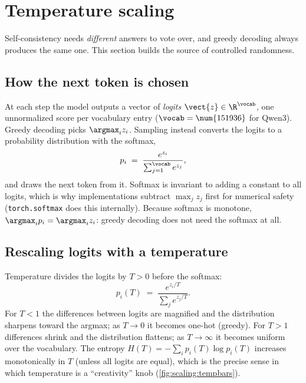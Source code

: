 \section{Temperature scaling}\label{sec:scaling:temp}


Self-consistency needs \emph{different} answers to vote over, and greedy decoding always produces
the same one. This section builds the source of controlled randomness.

\subsection{How the next token is chosen}\label{sec:scaling:select}

At each step the model outputs a vector of \emph{logits} $\vect{z} \in \R^{\vocab}$, one unnormalized
score per vocabulary entry ($\vocab = \num{151936}$ for Qwen3). Greedy decoding picks
$\argmax_i z_i$. Sampling instead converts the logits to a probability distribution with the
softmax,
\begin{equation}
  p_i \;=\; \frac{e^{z_i}}{\sum_{j=1}^{\vocab} e^{z_j}},
\end{equation}
and draws the next token from it. Softmax is invariant to adding a constant to all logits, which is
why implementations subtract $\max_j z_j$ first for numerical safety (\texttt{torch.softmax} does
this internally). Because softmax is monotone, $\argmax_i p_i = \argmax_i z_i$: greedy decoding
does not need the softmax at all.

\subsection{Rescaling logits with a temperature}\label{sec:scaling:rescale}

Temperature divides the logits by $T > 0$ before the softmax:
\begin{equation}
  p_i(T) \;=\; \frac{e^{z_i/T}}{\sum_j e^{z_j/T}}.
  \label{eq:scaling:temp}
\end{equation}
For $T < 1$ the differences between logits are magnified and the distribution sharpens toward the
argmax; as $T \to 0$ it becomes one-hot (greedy). For $T > 1$ differences shrink and the
distribution flattens; as $T \to \infty$ it becomes uniform over the vocabulary. The entropy
$H(T) = -\sum_i p_i(T) \log p_i(T)$ increases monotonically in $T$ (unless all logits are equal),
which is the precise sense in which temperature is a ``creativity'' knob
(\cref{fig:scaling:tempbars}).

